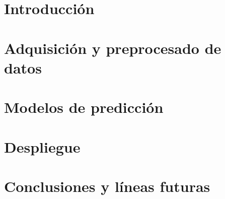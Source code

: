 \documentclass[spanish,a4paper,12pt,oneside]{extreport}
\begin{document}
\listoftables

\newpage{\pagestyle{empty}}

\newpage
\thispagestyle{empty}

\renewcommand{\thepage}{\arabic{page}}
\setcounter{page}{1}
\pagestyle{plain}

\chapter{\LARGE Introducción}
\label{chapter:intro}



\newpage{\pagestyle{empty}}
\thispagestyle{empty}

\chapter{\LARGE Adquisición y preprocesado de datos}
\label{chapter:dos}



\newpage{\pagestyle{empty}}
\thispagestyle{empty}

\chapter{\LARGE Modelos de predicción}
\label{chapter:tres}



\newpage{\pagestyle{empty}}
\thispagestyle{empty}

\chapter{\LARGE Despliegue}
\label{chapter:cuatro}



\newpage{\pagestyle{empty}}
\thispagestyle{empty}

\chapter{\LARGE Conclusiones y líneas futuras}
\label{chapter:Resultados}
\end{document}
